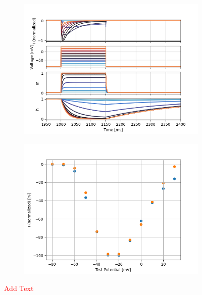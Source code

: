 \documentclass[../../workflow.tex]{subfiles}
\begin{document}
\begin{figure}[H]
    \centering
    \begin{subfigure}[t]{0.45\textwidth}
        \centering
        \includegraphics[width=\textwidth]{./img/t_type_calcium_channel/simulations/Scaling/Constant Field EquationVoltage Step Up-Down6_voltage_traces.png}
        \caption{}
        \label{fig_t_type_constant_field_voltage_traces_scaled}
    \end{subfigure}
    \hfill
    \begin{subfigure}[t]{0.45\textwidth}
        \centering
        \includegraphics[width=\textwidth]{./img/t_type_calcium_channel/simulations/Scaling/Constant Field EquationVoltage Step5_IV_Relationship_comparison_Jeong_2015.png}
        \caption{}
        \label{fig_t_type_constant_field_iv_relationship_scaled}
    \end{subfigure}
    
    \caption{\textcolor{red}{Add Text}}
    \label{fig_t_type_voltage_step_ohmic_vs_constant_field_scaled}
\end{figure}
\end{document}
